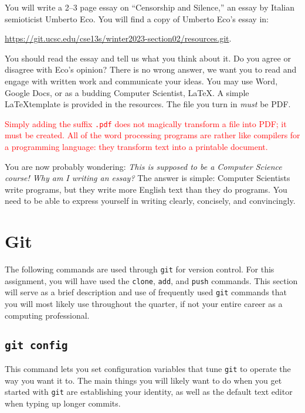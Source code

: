 \documentclass[11pt]{article}
\begin{document}
You will write a 2--3 page essay on ``Censorship and Silence,'' an essay by
Italian semioticist Umberto Eco. You will find a copy of Umberto Eco's essay in:

\vspace\baselineskip
\centerline{\url{https://git.ucsc.edu/cse13s/winter2023-section02/resources.git}.}
\vspace\baselineskip

\noindent
You
should read the essay and tell us what you think about it. Do you agree or
disagree with Eco's opinion? There is no wrong answer, we want you to read and
engage with written work and communicate your ideas. You may use Word, Google
Docs, or as a budding Computer Scientist, \LaTeX. A simple \LaTeX template is
provided in the resources. The file you turn in \emph{must} be PDF.

\textcolor{red}{Simply adding the
suffix \texttt{.pdf} does not magically transform a file into PDF;
it must be created. All of the word processing programs are rather
like compilers for a programming language: they transform text into
a printable document.}

You are now probably wondering: \emph{This is supposed to be a
Computer Science course! Why am I writing an essay?} The answer is
simple: Computer Scientists write programs, but they write more
English text than they do programs. You need to be able to express
yourself in writing clearly, concisely, and convincingly.

\section{Git}

The following commands are used through \texttt{git} for version control. For
this assignment, you will have used the \texttt{clone}, \texttt{add}, and
\texttt{push} commands. This section will serve as a brief description and use
of frequently used \texttt{git} commands that you will most likely use
throughout the quarter, if not your entire career as a computing professional.

\subsection{\texttt{git config}}

This command lets you set configuration variables that tune \texttt{git}
to operate the way you want it to. The main things you will likely want
to do when you get started with \texttt{git} are establishing your
identity, as well as the default text editor when typing up longer
commits.
\end{document}
